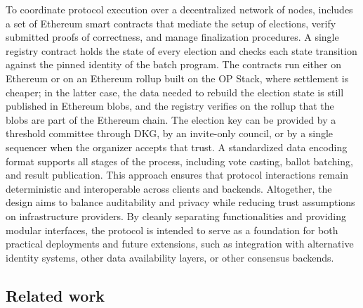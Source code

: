 To coordinate protocol execution over a decentralized network of nodes, \davinci includes a set of Ethereum smart contracts that mediate the setup of elections, verify submitted proofs of correctness, and manage finalization procedures. A single registry contract holds the state of every election and checks each state transition against the pinned identity of the batch program. The contracts run either on Ethereum or on an Ethereum rollup built on the OP Stack, where settlement is cheaper; in the latter case, the data needed to rebuild the election state is still published in Ethereum blobs, and the registry verifies on the rollup that the blobs are part of the Ethereum chain. The election key can be provided by a threshold committee through \ac{DKG}, by an invite-only council, or by a single sequencer when the organizer accepts that trust. A standardized data encoding format supports all stages of the process, including vote casting, ballot batching, and result publication. This approach ensures that protocol interactions remain deterministic and interoperable across clients and backends. Altogether, the design aims to balance auditability and privacy while reducing trust assumptions on infrastructure providers. By cleanly separating functionalities and providing modular interfaces, the protocol is intended to serve as a foundation for both practical deployments and future extensions, such as integration with alternative identity systems, other data availability layers, or other consensus backends.

\subsection{Related work}
\label{sec:introduction:sota}


